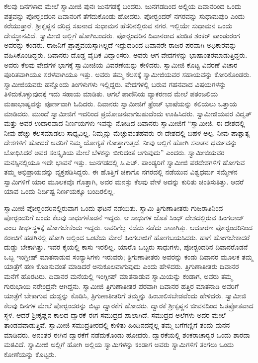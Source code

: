 ಕೆಲವು ದಿನಗಳಾದ ಮೇಲೆ ಸ್ವಾಮೀಜಿ ಪುನಃ ಜುನಗಡಕ್ಕೆ ಬಂದರು. ಜುನಗಡದಿಂದ ಅಲ್ಲಿಯ ದಿವಾನರಿಂದ ಒಂದು ಪತ್ರವನ್ನು ಪೋರ್‍ಬಂದರಿನ ದಿವಾನರಿಗೆ ತೆಗೆದುಕೊಂಡು ಹೋದರು. ಪೋರ್‍ಬಂದರ್ ನಗರವನ್ನು ಸುಧಾಮಪುರಿ ಎಂದು ಕರೆಯುತ್ತಾರೆ. ಶ‍್ರೀಕೃಷ್ಣನ ದರಿದ್ರ ಸಖನಾದ ಸುಧಾಮನ ಹೆಸರಿನಲ್ಲಿರುವ ನಗರ. ಇಲ್ಲಿಯೇ ಸುಧಾಮನ ಒಂದು ದೇವಸ್ಥಾನವಿದೆ. ಸ್ವಾಮೀಜಿ ಅಲ್ಲಿಗೆ ಹೋಗಿಬಂದರು. ಪೋರ್‍ಬಂದರಿನ ದಿವಾನರಾದ ಪಂಡಿತ ಶಂಕರ್ ಪಾಂಡುರಂಗ ಅವರನ್ನು ಕಂಡರು. ರಾಜನಿಗೆ ಪ್ರಾಪ್ತವಯಸ್ಸಾಗಿಲ್ಲದೆ ಇದ್ದುದರಿಂದ ದಿವಾನರೇ ರಾಜರ ಪರವಾಗಿ ಅಧಿಕಾರವನ್ನು ವಹಿಸಿಕೊಂಡಿದ್ದರು. ದಿವಾನರು ದೊಡ್ಡ ವೈದಿಕ ವಿದ್ವಾಂಸರು. ಅವರು ಆಗ ವೇದಗಳನ್ನು ಭಾಷಾಂತರಮಾಡುತ್ತಿದ್ದರು. ಅವರು ಕೆಲವು ವೇದಗಳ ಭಾಗಕ್ಕೆ ಸ್ವಾಮೀಜಿಯ ವಿವರಣೆಯನ್ನು ಕೇಳಿದರು. ಸ್ವಾಮೀಜಿ ಕೊಟ್ಟ ವಿವರಣೆ ವಿಚಾರ ಪೂರಿತವಾಗಿಯೂ ಸರಳವಾಗಿಯೂ ಇತ್ತು. ಅವರು ತಮ್ಮ ಕೆಲಸಕ್ಕೆ ಸ್ವಾಮೀಜಿಯವರ ಸಹಾಯವನ್ನು ಕೋರಿಕೊಂಡರು. ಸ್ವಾಮೀಜಿಯವರು ಹನ್ನೊಂದು ತಿಂಗಳುಗಳು ಇಲ್ಲಿದ್ದರು. ವೇದಗಳಲ್ಲಿ ಬರುವ ಗಹನವಾದ ವಿಷಯಗಳನ್ನು ತಿಳಿದುಕೊಳ್ಳುವುದಕ್ಕೆ ಇದು ಸಹಾಯ ಮಾಡಿತು. ಆಗಲೆ ಪಾಣಿನಿಯ ವ್ಯಾಕರಣದ ಮೇಲೆ ಪತಂಜಲಿಯ ಮಹಾಭಾಷ್ಯವನ್ನು ಪೂರ್ಣವಾಗಿ ಓದಿದರು. ದಿವಾನರು ಸ್ವಾಮೀಜಿಗೆ ಫ್ರೆಂಚ್ ಭಾಷೆಯನ್ನು ಕಲಿಯಲು ಒತ್ತಾಯ ಮಾಡಿದರು. ಮುಂದೆ ಸ್ವಾಮೀಜಿಗೆ ಇದರಿಂದ ಪ್ರಯೋಜನವಾಗಬಹುದೆಂದು ಊಹಿಸಿದರು. ಸ್ವಾಮೀಜಿಯವರ ವಿದ್ವತ್ ಮತ್ತು ಅವರ ಉದಾರವಾದ ನಿರ್ಣಯಗಳು ಇವನ್ನು ನೋಡಿದ ದಿವಾನರು ಸ್ವಾಮೀಜಿಗೆ “ಸ್ವಾಮೀಜಿ, ಈ ದೇಶದಲ್ಲಿ ನೀವು ಹೆಚ್ಚು ಕೆಲಸಮಾಡಲು ಸಾಧ್ಯವಿಲ್ಲ. ನಿಮ್ಮನ್ನು ಮೆಚ್ಚುವಂತಹವರು ಈ ದೇಶದಲ್ಲಿ ಬಹಳ ಅಲ್ಪ. ನೀವು ಪಾಶ್ಚಾತ್ಯ ದೇಶಗಳಿಗೆ ಹೋದರೆ ಅವರಿಗೆ ನಿಮ್ಮ ಯೋಗ್ಯತೆ ಗೋತ್ತಾಗುತ್ತದೆ. ನೀವು ಅಲ್ಲಿಗೆ ಹೋಗಿ ಸನಾತನ ಧರ್ಮವನ್ನು ಬೋಧಿಸಿದರೆ ಅವರ ಸಂಸ್ಕೃತಿಯ ಮೇಲೆ ಬೆಳಕನ್ನು ಬೀರಿದಂತೆ ಆಗುವುದು” ಎಂದರು. ಸ್ವಾಮೀಜಿಯವರ ಮನಸ್ಸಿನಲ್ಲಿಯೂ ಇದೇ ಭಾವನೆ ಇತ್ತು. ಜುನಗಡದಲ್ಲಿ ಸಿ.ಎಚ್. ಪಾಂಡ್ಯರಿಗೆ ಸ್ವಾಮೀಜಿ ಪರದೇಶಗಳಿಗೆ ಹೋಗುವ ತಮ್ಮ ಅಭಿಪ್ರಾಯವನ್ನು ವ್ಯಕ್ತಪಡಿಸಿದ್ದರು. ಈ ಹೊತ್ತಿಗೆ ಚಿಕಾಗೊ ನಗರದಲ್ಲಿ ನಡೆಯುವ ವಿಶ್ವಧರ್ಮ ಸಮ್ಮೇಳನ ಸ್ವಾಮಿಗಳಿಗೆ ಯಾರ ಮೂಲಕವೊ ಗೊತ್ತಾಗಿ, ಅವರ ಮನಸ್ಸು ಕೆಲವು ವೇಳೆ ಅದನ್ನು ಕುರಿತು ಚಿಂತಿಸುತಿತ್ತು. ಆದರೆ ಯಾವ ಒಂದು ನಿರ್ದಿಷ್ಟ ನಿರ್ಣಯಕ್ಕೂ ಬಂದಿರಲಿಲ್ಲ.

ಸ್ವಾಮೀಜಿ ಪೋರ್‍ಬಂದರಿನಲ್ಲಿರುವಾಗ ಒಂದು ಘಟನೆ ನಡೆಯಿತು. ಸ್ವಾಮಿ ತ್ರಿಗುಣಾತೀತರು ಗುಜರಾತಿನಿಂದ ಪೋರ್‍ಬಂದರಿಗೆ ಬಂದು ಕೆಲವು ಸಾಧುಗಳೊಡನೆ ಇದ್ದರು. ಆ ಸಾಧುಗಳ ಜೊತೆ ಸಿಂಧ್ ದೇಶದಲ್ಲಿರುವ ಹಿಂಗಲಾಜ್ ಎಂಬ ತೀರ್ಥಸ್ಥಳಕ್ಕೆ ಹೋಗಬೇಕೆಂದು ಇದ್ದರು. ಅವರಿಗೆಲ್ಲ ನಡೆದು ನಡೆದು ಸಾಕಾಗಿತ್ತು. ಆದಕಾರಣ ಪೋರ್‍ಬಂದರಿನಿಂದ ಕರಾಚಿಗೆ ಹಡಗಿನಲ್ಲಿ ಹೋಗಿ ಅಲ್ಲಿಂದ ಒಂಟೆಯ ಮೇಲೆ ಹಿಂಗಲಾಜಿಗೆ ಹೋಗಬಯಸಿದರು. ಹಾಗೆ ಹೋಗಬೇಕಾದರೆ ದುಡ್ಡು ಬೇಕಾಗಿತ್ತು. ಇವರ ಕೈಯಲ್ಲಿ ಕಾಸು ಇರಲಿಲ್ಲ. ಯಾರೊ ಒಬ್ಬರು ಸಾಧುಗಳು, ಪೋರ್‍ಬಂದರಿನ ದಿವಾನರೊಡನೆ ಒಬ್ಬ ಇಂಗ್ಲೀಷ್ ಮಾತನಾಡುವ ಸಂನ್ಯಾಸಿಗಳು ಇರುವರು; ತ್ರಿಗುಣಾತೀತರು ಅವರನ್ನು ಕಂಡು ದಿವಾನರ ಮೂಲಕ ತಮ್ಮ ಯಾತ್ರೆಗೆ ಹಣ ಕೊಡಿಸುವಂತೆ ಮಾಡಿದರೆ ಅನುಕೂಲವಾಗುವುದು ಎಂದು ಹೇಳಿದರು. ತ್ರಿಗುಣಾತೀತರು ದಿವಾನರ ಮನೆಗೆ ಹೊರಟರು. ದಿವಾನರ ಮನೆಯಲ್ಲಿ ಇಂಗ್ಲೀಷ್ ಮಾತನಾಡುವ ಸ್ವಾಮಿಯನ್ನು ಕಂಡಾಗ, ಅವರು ತಮ್ಮ ಗುರುಭಾಯಿ ನರೇಂದ್ರನೇ ಆಗಿದ್ದನು. ಸ್ವಾಮೀಜಿ ತ್ರಿಗುಣಾತೀತರ ಪರವಾಗಿ ದಿವಾನರ ಹತ್ತಿರ ಮಾತನಾಡಿ ಅವರಿಗೆ ಯಾತ್ರೆಗೆ ಬೇಕಾಗುವ ದುಡ್ಡನ್ನು ಕೊಡಿಸಿ, ತ್ರಿಗುಣಾತೀತರಿಗೆ ತಮ್ಮನ್ನು ಹಿಂಬಾಲಿಸಬೇಡವೆಂದು ಹೇಳಿದರು. ಸ್ವಾಮೀಜಿ ಕೆಲವು ದಿನಗಳ ಮೇಲೆ ಪೋರ್‍ಬಂದರನ್ನು ಬಿಟ್ಟು ದ್ವಾರಕೆಗೆ ಹೋದರು. ದ್ವಾರಕೆ ಶ‍್ರೀಕೃಷ್ಣನ ಜೀವನದಿಂದ ಓತಪ್ರೋತವಾದ ಸ್ಥಳ. ಆದರೆ ಶ‍್ರೀಕೃಷ್ಣನ ಕಾಲದ ದ್ವಾರಕೆ ಈಗ ಸಮುದ್ರದ ಪಾಲಾಗಿದೆ. ಸಮುದ್ರದ ಅಲೆಗಳು ಅದರ ಮೇಲೆ ತಾಂಡವವಾಡುತ್ತಿವೆ. ಸ್ವಾಮೀಜಿ ಸಮುದ್ರತೀರದಲ್ಲಿ ಕುಳಿತು ಹಿಂದಿನದನ್ನೆಲ್ಲ ತಮ್ಮ ಬಗೆಗಣ್ಣಿಗೆ ತಂದು ಮನನ ಮಾಡಿದರು. ಅನಂತರ ಈಗಿನ ದ್ವಾರಕೆಗೆ ನಡೆದುಕೊಂಡು ಹೋದರು. ದ್ವಾರಕೆಯಲ್ಲಿ ಶಂಕರಾಚಾರ‍್ಯರ ಒಂದು ಶಾರದಾ ಮಠವಿದೆ. ಸ್ವಾಮೀಜಿ ಅಲ್ಲಿಗೆ ಹೋಗಿ ಅಲ್ಲಿಯ ಸ್ವಾಮಿಗಳನ್ನು ಕಂಡಾಗ ಅವರು ಸ್ವಾಮಿಗಳಿಗೆ ತಂಗಲು ಒಂದು ಕೋಣೆಯನ್ನು ಕೊಟ್ಟರು.


